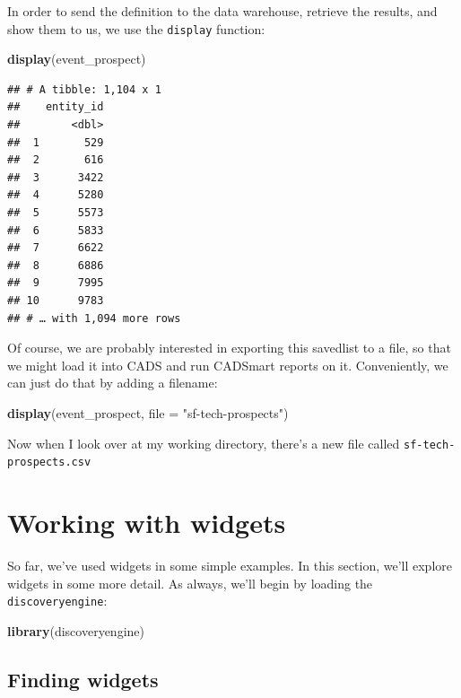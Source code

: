 \documentclass[]{book}
\newenvironment{Shaded}{\begin{snugshade}}{\end{snugshade}}
\newcommand{\DataTypeTok}[1]{\textcolor[rgb]{0.13,0.29,0.53}{#1}}
\newcommand{\KeywordTok}[1]{\textcolor[rgb]{0.13,0.29,0.53}{\textbf{#1}}}
\newcommand{\NormalTok}[1]{#1}
\newcommand{\StringTok}[1]{\textcolor[rgb]{0.31,0.60,0.02}{#1}}
\begin{document}
In order to send the definition to the data warehouse, retrieve the results, and show them to us, we use the \texttt{display} function:

\begin{Shaded}
\begin{Highlighting}[]
\KeywordTok{display}\NormalTok{(event_prospect)}
\end{Highlighting}
\end{Shaded}

\begin{verbatim}
## # A tibble: 1,104 x 1
##    entity_id
##        <dbl>
##  1       529
##  2       616
##  3      3422
##  4      5280
##  5      5573
##  6      5833
##  7      6622
##  8      6886
##  9      7995
## 10      9783
## # … with 1,094 more rows
\end{verbatim}

Of course, we are probably interested in exporting this savedlist to a file, so that we might load it into CADS and run CADSmart reports on it. Conveniently, we can just do that by adding a filename:

\begin{Shaded}
\begin{Highlighting}[]
\KeywordTok{display}\NormalTok{(event_prospect, }\DataTypeTok{file =} \StringTok{"sf-tech-prospects"}\NormalTok{)}
\end{Highlighting}
\end{Shaded}

Now when I look over at my working directory, there's a new file called \texttt{sf-tech-prospects.csv}

\hypertarget{working-with-widgets}{%
\chapter{Working with widgets}\label{working-with-widgets}}

So far, we've used widgets in some simple examples. In this section, we'll explore widgets in some more detail. As always, we'll begin by loading the \texttt{discoveryengine}:

\begin{Shaded}
\begin{Highlighting}[]
\KeywordTok{library}\NormalTok{(discoveryengine)}
\end{Highlighting}
\end{Shaded}

\hypertarget{working-with-finding-widgets}{%
\section{Finding widgets}\label{working-with-finding-widgets}}
\end{document}
